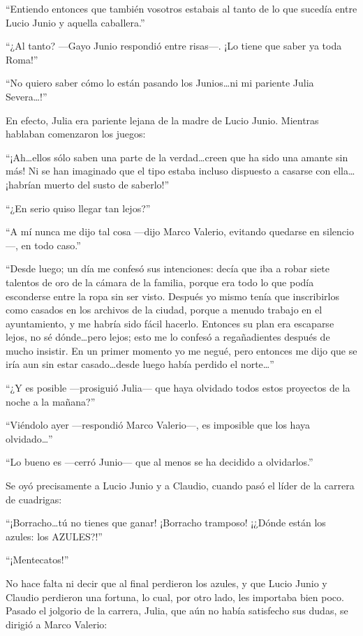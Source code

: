 \documentclass[11pt,openany]{book}
\begin{document}
“Entiendo entonces que también vosotros estabais al tanto de lo que sucedía entre Lucio Junio y aquella caballera.” 

“¿Al tanto? —Gayo Junio respondió entre risas—. ¡Lo tiene que saber ya toda Roma!” 

“No quiero saber cómo lo están pasando los Junios\dots ni mi pariente Julia Severa\dots!” 

En efecto, Julia era pariente lejana de la madre de Lucio Junio. Mientras hablaban comenzaron los juegos: 

“¡Ah\dots ellos sólo saben una parte de la verdad\dots creen que ha sido una amante sin más! Ni se han imaginado que el tipo estaba incluso dispuesto a casarse con ella\dots ¡habrían muerto del susto de saberlo!” 

“¿En serio quiso llegar tan lejos?” 

“A mí nunca me dijo tal cosa —dijo Marco Valerio, evitando quedarse en silencio—, en todo caso.” 

“Desde luego; un día me confesó sus intenciones: decía que iba a robar siete talentos de oro de la cámara de la familia, porque era todo lo que podía esconderse entre la ropa sin ser visto. Después yo mismo tenía que inscribirlos como casados en los archivos de la ciudad, porque a menudo trabajo en el ayuntamiento, y me habría sido fácil hacerlo. Entonces su plan era escaparse lejos, no sé dónde\dots pero lejos; esto me lo confesó a regañadientes después de mucho insistir. En un primer momento yo me negué, pero entonces me dijo que se iría aun sin estar casado\dots desde luego había perdido el norte\dots” 

“¿Y es posible —prosiguió Julia— que haya olvidado todos estos proyectos de la noche a la mañana?” 

“Viéndolo ayer —respondió Marco Valerio—, es imposible que los haya olvidado\dots” 

“Lo bueno es —cerró Junio— que al menos se ha decidido a olvidarlos.” 

Se oyó precisamente a Lucio Junio y a Claudio, cuando pasó el líder de la carrera de cuadrigas: 

“¡Borracho\dots tú no tienes que ganar! ¡Borracho tramposo! ¡¿Dónde están los azules: los AZULES?!” 

“¡Mentecatos!” 

No hace falta ni decir que al final perdieron los azules, y que Lucio Junio y Claudio perdieron una fortuna, lo cual, por otro lado, les importaba bien poco. Pasado el jolgorio de la carrera, Julia, que aún no había satisfecho sus dudas, se dirigió a Marco Valerio: 
\end{document}
